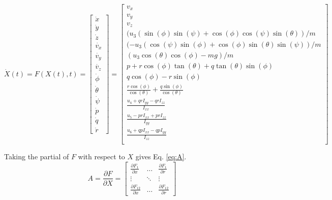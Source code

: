 \documentclass[letterpaper, paper,11pt]{AAS}	%
\begin{document}
\begin{equation}
\label{eq:Xdot}
\dot{X}(t) = F(X(t), t) = \begin{bmatrix}
\dot{x} \\ \dot{y} \\ \dot{z} \\ \dot{v_x} \\ \dot{v_y} \\ \dot{v_z} \\ \dot{\phi} \\ \dot{\theta} \\ \dot{\psi} \\ \dot{p} \\ \dot{q} \\ \dot{r} 
\end{bmatrix} =  \begin{bmatrix}
v_x \\
v_y \\
v_z \\
(u_3(\sin(\phi)\sin(\psi) + \cos(\phi)\cos(\psi)\sin(\theta))/m \\
(-u_3(\cos(\psi)\sin(\phi) + \cos(\phi)\sin(\theta)\sin(\psi))/m \\
(u_3\cos(\theta)\cos(\phi) - mg)/m \\
p + r\cos(\phi)\tan(\theta) + q\tan(\theta)\sin(\phi) \\
q\cos(\phi) - r\sin(\phi) \\
\frac{r\cos(\phi)}{\cos(\theta)} + \frac{q\sin(\phi)}{\cos(\theta)} \\
\frac{u_4 + qrI_{yy} - qrI_{zz}}{I_{xx}} \\
\frac{u_5 - prI_{xx} + prI_{zz}}{I_{yy}} \\
\frac{u_6 + qpI_{xx} - qpI_{yy}}{I_{zz}} \\
\end{bmatrix}
\end{equation}

Taking the partial of $F$ with respect to $X$ gives Eq. \eqref{eq:A}.
\begin{equation}
\label{eq:A}
A = \frac{\partial F}{\partial X} = 
\begin{bmatrix} 
    \frac{\partial F_1}{\partial x} & \dots  & \frac{\partial F_1}{\partial r}\\
    \vdots & \ddots & \vdots\\
    \frac{\partial F_{12}}{\partial x} & \dots  & \frac{\partial F_{12}}{\partial r} 
\end{bmatrix}
\end{equation}
\end{document}
